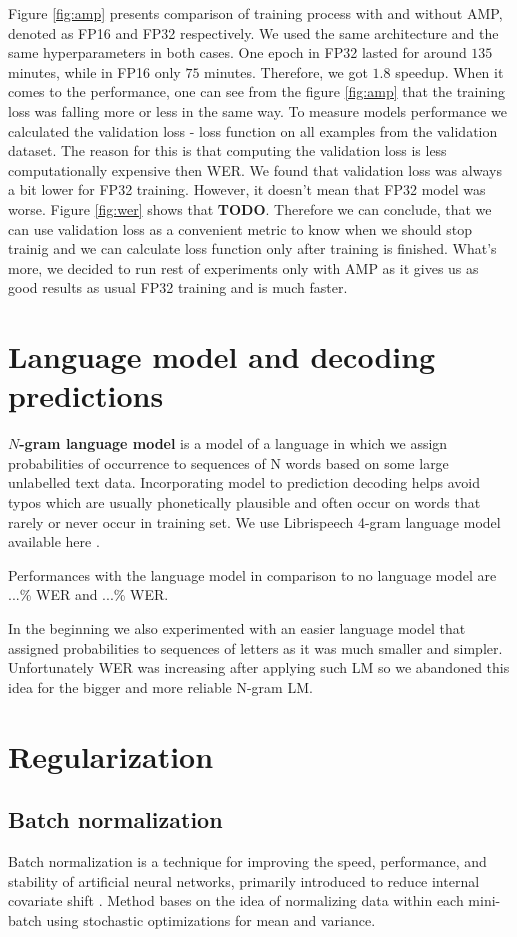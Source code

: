 \documentclass[licencjacka,en]{pracamgr}
\begin{document}
Figure \ref{fig:amp} presents comparison of training process with and without AMP, denoted as FP16 and FP32 respectively. We used the same architecture and the same hyperparameters in both cases. One epoch in FP32 lasted for around $135$ minutes, while in FP16 only $75$ minutes. Therefore, we got $1.8$ speedup. When it comes to the performance, one can see from the figure \ref{fig:amp} that the training loss was falling more or less in the same way. To measure models performance we calculated the validation loss - loss function on all examples from the validation dataset. The reason for this is that computing the validation loss is less computationally expensive then WER. We found that validation loss was always a bit lower for FP32 training. However, it doesn't mean that FP32 model was worse. Figure \ref{fig:wer} shows that \textbf{TODO}. Therefore we can conclude, that we can use validation loss as a convenient metric to know when we should stop trainig and we can calculate loss function only after training is finished. What's more, we decided to run rest of experiments only with AMP as it gives us as good results as usual FP32 training and is much faster.

\section{Language model and decoding predictions}
\textbf{$N$-gram language model} is a model of a language in which we assign probabilities of occurrence to sequences of N words based on some large unlabelled text data. Incorporating model to prediction decoding helps avoid typos which are usually phonetically plausible and often occur on words that rarely or never occur in training set. We use Librispeech 4-gram language model available here \cite{LM-LINK}.

Performances with the language model in comparison to no language model are ...\% WER and ...\% WER.

In the beginning we also experimented with an easier language model that assigned probabilities to sequences of letters as it was much smaller and simpler. Unfortunately WER was increasing after applying such LM so we abandoned this idea for the bigger and more reliable N-gram LM.

\section{Regularization}
\subsection{Batch normalization}
Batch normalization is a technique for improving the speed, performance, and stability of artificial neural networks, primarily introduced to reduce internal covariate shift \cite{BN}. Method bases on the idea of normalizing data within each mini-batch using stochastic optimizations for mean and variance.
\end{document}
